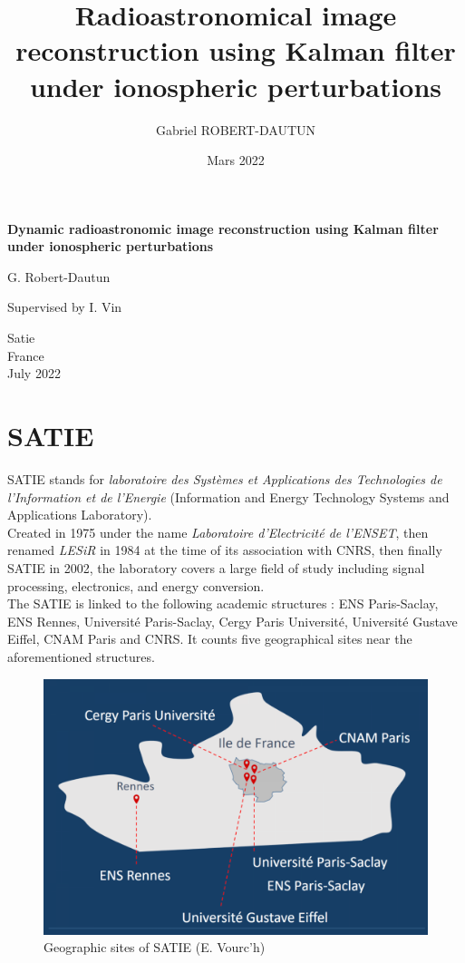 \documentclass[titlepage]{article}
\author{Gabriel ROBERT-DAUTUN}
\date{Mars 2022}
\title{%
	Radioastronomical image reconstruction using Kalman filter under ionospheric perturbations}
\begin{document}
	
	\begin{titlepage}
	
	\vspace*{.3\textheight}
	\huge
	\centering
	\textbf{Dynamic radioastronomic image reconstruction using Kalman filter under ionospheric perturbations}
	
	\vspace{1cm}
	\LARGE
	G. Robert-Dautun
	
	\vfill
	\large
	Supervised by I. Vin
	
	\vspace{0.8cm}
	
	\Large
	Satie\\
	France\\
	July 2022
	
	\end{titlepage}
	
	\newpage
	\tableofcontents
	
		\newpage
	\part{SATIE}
	
	SATIE stands for \emph{laboratoire des Systèmes et Applications des Technologies de l'Information et de l'Energie} (Information and Energy Technology Systems and Applications Laboratory).\\
	Created in 1975 under the name \emph{Laboratoire d'Electricité de l'ENSET}, then renamed \emph{LESiR} in 1984 at the time of its association with CNRS, then finally SATIE in 2002, the laboratory covers a large field of study including signal processing, electronics, and energy conversion.\\
	
	The SATIE is linked to the following academic structures : ENS Paris-Saclay, ENS Rennes, Université Paris-Saclay, Cergy Paris Université, Université Gustave Eiffel, CNAM Paris and CNRS. It counts five geographical sites near the aforementioned structures. 
	
	\begin{figure}[H]
		\centering
		\includegraphics[width=0.7\linewidth]{src/sites_geoo_satie}
		\caption{Geographic sites of SATIE (\textcopyright E. Vourc'h)}
		\label{fig:sitesgeoosatie}
	\end{figure}
	
\end{document}
